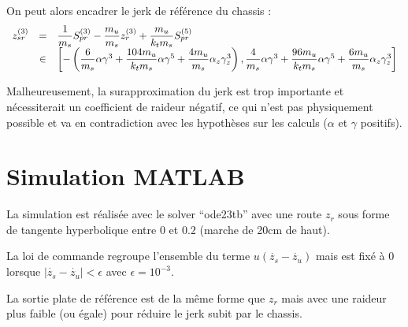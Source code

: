 \documentclass[10pt]{article}
\begin{document}
On peut alors encadrer le jerk de référence du chassis :
\[
\begin{array}{r c l}
  z_{sr}^{(3)} &=& \dfrac{1}{m_s} S_{pr}^{(3)} - \dfrac{m_u}{m_s} z_r^{(3)} + \dfrac{m_u}{k_t m_s} S_{pr}^{(5)} \\
  &\in& \left[ - \left( \dfrac{6}{m_s} \alpha \gamma^3 + \dfrac{104 m_u}{k_t m_s} \alpha \gamma^5 + \dfrac{4 m_u}{m_s} \alpha_z \gamma_z^3 \right), \dfrac{4}{m_s} \alpha \gamma^3 + \dfrac{96 m_u}{k_t m_s} \alpha \gamma^5 + \dfrac{6 m_u}{m_s} \alpha_z \gamma_z^3\right] \\
\end{array}
\]

Malheureusement, la surapproximation du jerk est trop importante et nécessiterait un coefficient de raideur négatif, ce qui n'est pas physiquement possible et va en contradiction avec les hypothèses sur les calculs ($\alpha$ et $\gamma$ positifs).

\section{Simulation MATLAB}

La simulation est réalisée avec le solver ``ode23tb'' avec une route $z_r$ sous forme de tangente hyperbolique entre $0$ et $0.2$ (marche de 20cm de haut).

La loi de commande regroupe l'ensemble du terme $u \left( \dot{z_s} - \dot{z_u} \right)$ mais est fixé à $0$ lorsque $\left| \dot{z_s} - \dot{z_u} \right| < \epsilon$ avec $\epsilon = 10^{-3}$.

La sortie plate de référence est de la même forme que $z_r$ mais avec une raideur plus faible (ou égale) pour réduire le jerk subit par le chassis.
\end{document}
